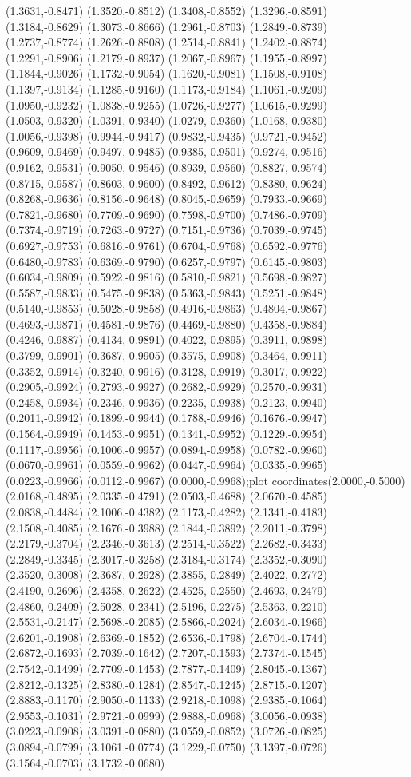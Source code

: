 {(1.3631,-0.8471) (1.3520,-0.8512) (1.3408,-0.8552) (1.3296,-0.8591) (1.3184,-0.8629) (1.3073,-0.8666) (1.2961,-0.8703) (1.2849,-0.8739) (1.2737,-0.8774) (1.2626,-0.8808) (1.2514,-0.8841) (1.2402,-0.8874) (1.2291,-0.8906) (1.2179,-0.8937) (1.2067,-0.8967) (1.1955,-0.8997) (1.1844,-0.9026) (1.1732,-0.9054) (1.1620,-0.9081) (1.1508,-0.9108) (1.1397,-0.9134) (1.1285,-0.9160) (1.1173,-0.9184) (1.1061,-0.9209) (1.0950,-0.9232) (1.0838,-0.9255) (1.0726,-0.9277) (1.0615,-0.9299) (1.0503,-0.9320) (1.0391,-0.9340) (1.0279,-0.9360) (1.0168,-0.9380) (1.0056,-0.9398) (0.9944,-0.9417) (0.9832,-0.9435) (0.9721,-0.9452) (0.9609,-0.9469) (0.9497,-0.9485) (0.9385,-0.9501) (0.9274,-0.9516) (0.9162,-0.9531) (0.9050,-0.9546) (0.8939,-0.9560) (0.8827,-0.9574) (0.8715,-0.9587) (0.8603,-0.9600) (0.8492,-0.9612) (0.8380,-0.9624) (0.8268,-0.9636) (0.8156,-0.9648) (0.8045,-0.9659) (0.7933,-0.9669) (0.7821,-0.9680) (0.7709,-0.9690) (0.7598,-0.9700) (0.7486,-0.9709) (0.7374,-0.9719) (0.7263,-0.9727) (0.7151,-0.9736) (0.7039,-0.9745) (0.6927,-0.9753) (0.6816,-0.9761) (0.6704,-0.9768) (0.6592,-0.9776) (0.6480,-0.9783) (0.6369,-0.9790) (0.6257,-0.9797) (0.6145,-0.9803) (0.6034,-0.9809) (0.5922,-0.9816) (0.5810,-0.9821) (0.5698,-0.9827) (0.5587,-0.9833) (0.5475,-0.9838) (0.5363,-0.9843) (0.5251,-0.9848) (0.5140,-0.9853) (0.5028,-0.9858) (0.4916,-0.9863) (0.4804,-0.9867) (0.4693,-0.9871) (0.4581,-0.9876) (0.4469,-0.9880) (0.4358,-0.9884) (0.4246,-0.9887) (0.4134,-0.9891) (0.4022,-0.9895) (0.3911,-0.9898) (0.3799,-0.9901) (0.3687,-0.9905) (0.3575,-0.9908) (0.3464,-0.9911) (0.3352,-0.9914) (0.3240,-0.9916) (0.3128,-0.9919) (0.3017,-0.9922) (0.2905,-0.9924) (0.2793,-0.9927) (0.2682,-0.9929) (0.2570,-0.9931) (0.2458,-0.9934) (0.2346,-0.9936) (0.2235,-0.9938) (0.2123,-0.9940) (0.2011,-0.9942) (0.1899,-0.9944) (0.1788,-0.9946) (0.1676,-0.9947) (0.1564,-0.9949) (0.1453,-0.9951) (0.1341,-0.9952) (0.1229,-0.9954) (0.1117,-0.9956) (0.1006,-0.9957) (0.0894,-0.9958) (0.0782,-0.9960) (0.0670,-0.9961) (0.0559,-0.9962) (0.0447,-0.9964) (0.0335,-0.9965) (0.0223,-0.9966) (0.0112,-0.9967) (0.0000,-0.9968)};plot coordinates{(2.0000,-0.5000) (2.0168,-0.4895) (2.0335,-0.4791) (2.0503,-0.4688) (2.0670,-0.4585) (2.0838,-0.4484) (2.1006,-0.4382) (2.1173,-0.4282) (2.1341,-0.4183) (2.1508,-0.4085) (2.1676,-0.3988) (2.1844,-0.3892) (2.2011,-0.3798) (2.2179,-0.3704) (2.2346,-0.3613) (2.2514,-0.3522) (2.2682,-0.3433) (2.2849,-0.3345) (2.3017,-0.3258) (2.3184,-0.3174) (2.3352,-0.3090) (2.3520,-0.3008) (2.3687,-0.2928) (2.3855,-0.2849) (2.4022,-0.2772) (2.4190,-0.2696) (2.4358,-0.2622) (2.4525,-0.2550) (2.4693,-0.2479) (2.4860,-0.2409) (2.5028,-0.2341) (2.5196,-0.2275) (2.5363,-0.2210) (2.5531,-0.2147) (2.5698,-0.2085) (2.5866,-0.2024) (2.6034,-0.1966) (2.6201,-0.1908) (2.6369,-0.1852) (2.6536,-0.1798) (2.6704,-0.1744) (2.6872,-0.1693) (2.7039,-0.1642) (2.7207,-0.1593) (2.7374,-0.1545) (2.7542,-0.1499) (2.7709,-0.1453) (2.7877,-0.1409) (2.8045,-0.1367) (2.8212,-0.1325) (2.8380,-0.1284) (2.8547,-0.1245) (2.8715,-0.1207) (2.8883,-0.1170) (2.9050,-0.1133) (2.9218,-0.1098) (2.9385,-0.1064) (2.9553,-0.1031) (2.9721,-0.0999) (2.9888,-0.0968) (3.0056,-0.0938) (3.0223,-0.0908) (3.0391,-0.0880) (3.0559,-0.0852) (3.0726,-0.0825) (3.0894,-0.0799) (3.1061,-0.0774) (3.1229,-0.0750) (3.1397,-0.0726) (3.1564,-0.0703) (3.1732,-0.0680) }
